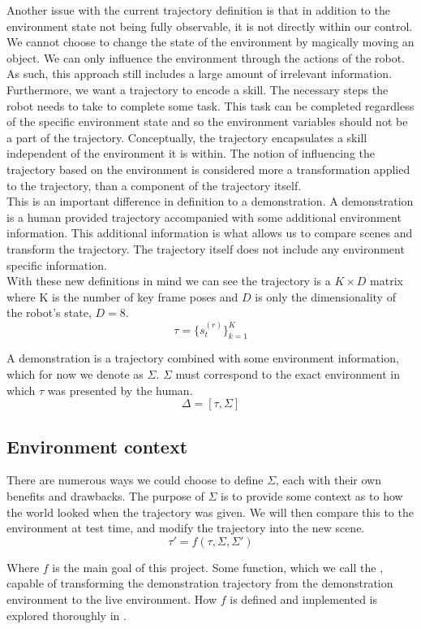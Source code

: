 Another issue with the current trajectory definition is that in addition to the environment state not being fully observable, it is not directly within our control. We cannot choose to change the state of the environment by magically moving an object. We can only influence the environment through the actions of the robot. As such, this approach still includes a large amount of irrelevant information. Furthermore, we want a trajectory to encode a skill. The necessary steps the robot needs to take to complete some task. This task can be completed regardless of the specific environment state and so the environment variables should not be a part of the trajectory. Conceptually, the trajectory encapsulates a skill independent of the environment it is within. The notion of influencing the trajectory based on the environment is considered more a transformation applied to the trajectory, than a component of the trajectory itself.\\

This is an important difference in definition to a demonstration. A demonstration is a human provided trajectory accompanied with some additional environment information. This additional information is what allows us to compare scenes and transform the trajectory. The trajectory itself does not include any environment specific information.\\

With these new definitions in mind we can see the trajectory is a $K \times D$ matrix where K is the number of key frame poses and $D$ is only the dimensionality of the robot's state, $D = 8$.
$$\tau = \{s^{(r)}_t\}_{k=1}^K$$

A demonstration is a trajectory combined with some environment information, which for now we denote as $\Sigma$. $\Sigma$ must correspond to the exact environment in which $\tau$ was presented by the human.
$$\Delta = [\tau, \Sigma]$$

\subsection{Environment context}
There are numerous ways we could choose to define $\Sigma$, each with their own benefits and drawbacks. The purpose of $\Sigma$ is to provide some context as to how the world looked when the trajectory was given. We will then compare this to the environment at test time, and modify the trajectory into the new scene.
$$\tau' = f(\tau, \Sigma, \Sigma')$$

Where $f$ is the main goal of this project. Some function, which we call the , capable of transforming the demonstration trajectory from the demonstration environment to the live environment. How $f$ is defined and implemented is explored thoroughly in .\\

